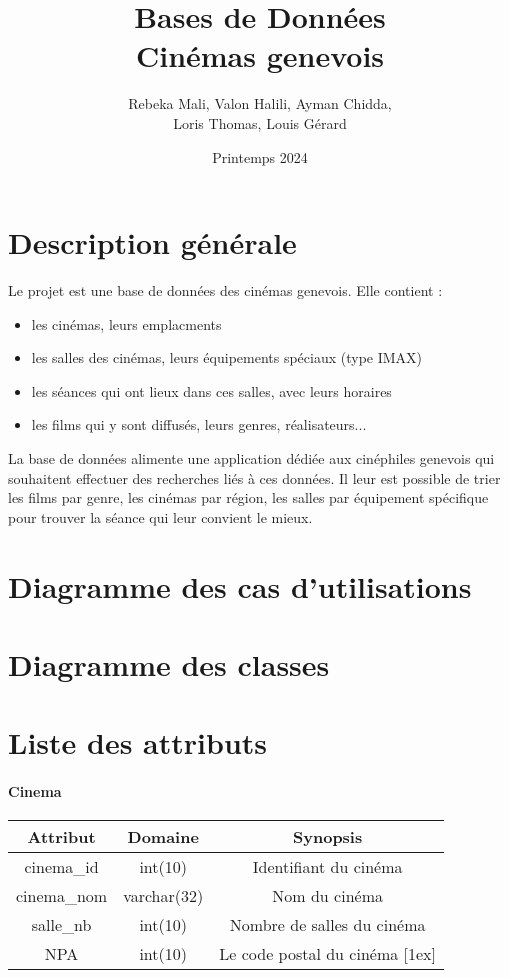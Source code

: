 \documentclass[12pt]{article}
\title{Bases de Données \\ Cinémas genevois}
\author{Rebeka Mali, Valon Halili, Ayman Chidda,\\ Loris Thomas, Louis Gérard}
\date{Printemps 2024}
\begin{document}
\maketitle

\section{Description générale}
Le projet est une base de données des cinémas genevois. Elle contient : 
\begin{itemize}
    \item les cinémas, leurs emplacments
    \item les salles des cinémas, leurs équipements spéciaux (type IMAX)
    \item les séances qui ont lieux dans ces salles, avec leurs horaires
    \item les films qui y sont diffusés, leurs genres, réalisateurs...
\end{itemize}
La base de données alimente une application dédiée aux cinéphiles genevois qui souhaitent
effectuer des recherches liés à ces données. Il leur est possible de trier les films par genre,
les cinémas par région, les salles par équipement spécifique pour trouver la séance qui leur convient le mieux.
\pagebreak
\section{Diagramme des cas d'utilisations}

\pagebreak
\section{Diagramme des classes}
\pagebreak
\section{Liste des attributs}
\paragraph*{Cinema}
\begin{center}
    \begin{tabular}{||c c c||} 
     \hline
     Attribut & Domaine & Synopsis\\ [0.5ex] 
     \hline\hline
     cinema{\_}id & int(10) & Identifiant du cinéma \\ 
     \hline
     cinema{\_}nom & varchar(32) & Nom du cinéma \\
     \hline
     salle{\_}nb & int(10) & Nombre de salles du cinéma\\
     \hline
     NPA & int(10) & Le code postal du cinéma [1ex] \\
     \hline
    \end{tabular}
\end{center}
\end{document}
